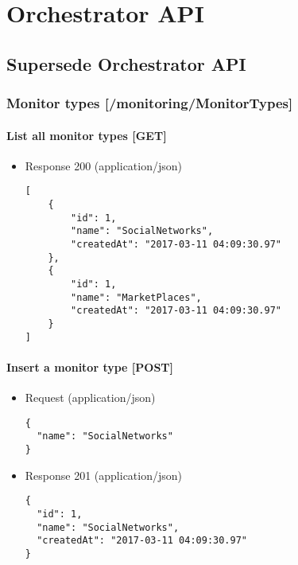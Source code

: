 
\chapter{Orchestrator API} %

\label{Orchestrator} %

\section{Supersede Orchestrator API}\label{supersede-orchestrator-api}

\subsection{Monitor types
{[}/monitoring/MonitorTypes{]}}\label{monitor-types-monitoringmonitortypes}

\subsubsection{List all monitor types
{[}GET{]}}\label{list-all-monitor-types-get}

\begin{itemize}

\item
  Response 200 (application/json)

\begin{verbatim}
[
	{
  		"id": 1,
  		"name": "SocialNetworks",
 		"createdAt": "2017-03-11 04:09:30.97"
	},
	{
		"id": 1,
		"name": "MarketPlaces",
		"createdAt": "2017-03-11 04:09:30.97"
	}
]
\end{verbatim}
\end{itemize}


\subsubsection{Insert a monitor type
{[}POST{]}}\label{insert-a-monitor-type-post}

\begin{itemize}
\item
  Request (application/json)

\begin{verbatim}
{
  "name": "SocialNetworks"
}
\end{verbatim}
\item
  Response 201 (application/json)

\begin{verbatim}
{
  "id": 1,
  "name": "SocialNetworks",
  "createdAt": "2017-03-11 04:09:30.97"
}
\end{verbatim}
\end{itemize}

